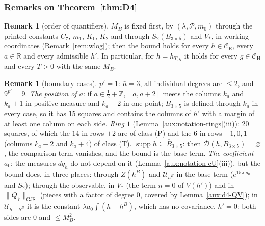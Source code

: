 \documentclass[11pt,a4paper]{article}
\theoremstyle{plain}
\theoremstyle{definition}
\theoremstyle{plain}
\theoremstyle{definition}
\newtheorem{auxrem}[auxlemma]{Remark}
\newcommand{\R}{\mathbb{R}}
\newcommand{\Z}{\mathbb{Z}}
\newcommand{\CE}{\mathcal{C}_{\mathrm E}}
\newcommand{\CH}{\mathcal{C}_{\mathrm H}}
\DeclareMathOperator{\supp}{supp}
\newcommand{\GJS}[1]{\lVert #1\rVert_{\mathrm{GJS}}}   %
\newcommand{\Uc}{\mathcal U}
\begin{document}
\subsubsection{Remarks on Theorem~\ref{thm:D4}}\label{sub:d4-rem}

\begin{auxrem}[order of quantifiers]\label{aux:d4-quant}
$M_B$ is fixed first, by $(\lambda,\mathscr P,m_0)$ through the printed constants $C_7$, $m_1$,
$K_1$, $K_2$ and through $S_2(B_{3\times5})$ and $V_*$, in working coordinates (Remark~\ref{rem:wlog}); then the bound holds for every $h\in\CE$, every $a\in\R$ and every admissible $h'$.  In
particular, for $h=h_{T,g}$ it holds for every $g\in\CH$ and every $T>0$ with the same $M_B$.
\end{auxrem}

\begin{auxrem}[boundary cases]\label{aux:d4-boundary}
\emph{$p'=1$}: $\bar n=3$, all individual degrees are $\le2$, and $9^{p'}=9$.
\emph{The position of $a$}: if $a\in\frac12+\Z$, $[a,a+2]$ meets the columns $k_a$ and $k_a+1$ in
positive measure and $k_a+2$ in one point; $B_{3\times5}$ is defined through $k_a$ in every case,
so it has $15$ squares and contains the columns of $h'$ with a margin of at least one column on
each side.
\emph{Ring $1$} (Lemma~\ref{aux:notation-rings}(iii)): $20$ squares, of which the $14$ in rows
$\pm2$ are of class (P) and the $6$ in rows $-1,0,1$ (columns $k_a-2$ and $k_a+4$) of class (T).
\emph{$\supp h\subseteq\overline B_{3\times5}$}: then $\mathcal D(h,B_{3\times5})=\varnothing$, the
comparison term vanishes, and the bound is the base term.
\emph{The coefficient $a_0$}: the measures $dq_h$ do not depend on it
(Lemma~\ref{aux:notation-cU}(iii)), but the bound does, in three places: through $Z(h^B)$ and
$\Uc_{h^B}$ in the base term ($e^{15\lambda|a_0|}$ and $S_2$); through the observable, in $V_*$ (the
term $n=0$ of $V(h')$) and in $\GJS{Q_V}$ (pieces with a factor of degree $0$, covered by
Lemma~\ref{aux:d4-QV}); in $\Uc_{h-h^B}$ it is the constant $\lambda a_0\int(h-h^B)$, which has no
covariance.
\emph{$h'=0$}: both sides are $0$ and $\le M_B^2$.
\end{auxrem}
\end{document}
